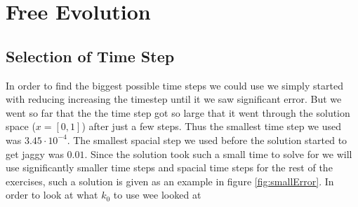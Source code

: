 \documentclass[11pt]{article}
\begin{document}
\newpage
\section{Free Evolution}
\subsection{Selection of Time Step}
In order to find the biggest possible time steps we could use we simply started with reducing increasing the timestep until it we saw significant error. But we went so far that the the time step got so large that it went through the solution space ($x=[0,1]$) after just a few steps. Thus the smallest time step we used was  $3.45\cdot 10^{-4}$. The smallest spacial step we used before the solution started to get jaggy was $0.01$. Since the solution took such a small time to solve for we will use significantly smaller time steps and spacial time steps for the rest of the exercises, such a solution is given as an example in figure \ref{fig:smallError}. In order to look at what $k_0$ to use wee looked at
\end{document}
